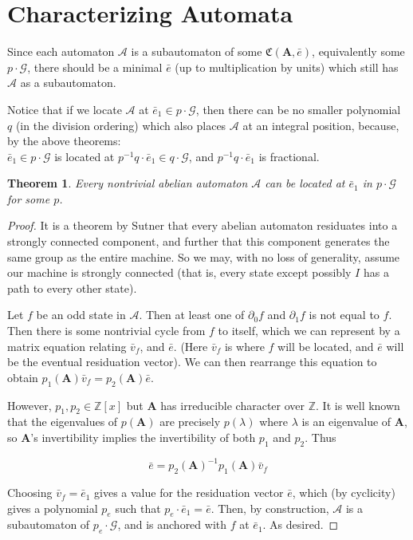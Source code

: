 \documentclass[runningheads]{llncs}
\newcommand{\A}{\mathcal{A}}
\newcommand{\G}{\mathcal{G}}
\newcommand{\C}{\mathfrak{C}(\Am,\e)}
\newcommand{\Z}{\mathbb{Z}}
\newcommand{\2}{\textbf{2}}
\newcommand{\Am}{\textbf{A}}
\newcommand{\del}{\partial}
\renewcommand{\v}{\bar{v}}
\newcommand{\e}{\bar{e}}
\newtheorem{thm}{Theorem}
\begin{document}
\section{Characterizing Automata}
Since each automaton $\A$ is a subautomaton of some $\C$,
equivalently some $p \cdot \G$, there should be a minimal $\e$ 
(up to multiplication by units) which still has $\A$ as a subautomaton. 

Notice that if we locate $\A$ at $\e_1 \in p \cdot \G$, 
then there can be no smaller polynomial $q$ (in the division ordering)
which also places $\A$ at an integral position, because, by the above
theorems:\\ 
$\e_1 \in p \cdot \G$ is located at $p^{-1}q \cdot \e_1 \in q \cdot \G$, 
and $p^{-1}q \cdot \e_1$ is fractional.


\begin{thm}
  Every nontrivial abelian automaton $\A$ can be 
  located at $\e_1$ in $p \cdot \G$ for some $p$.
\end{thm}

\begin{proof}
  It is a theorem by Sutner \cite{Sutner18:abelian_automata} that every 
  abelian automaton residuates into a strongly connected component, 
  and further that this component generates the same group as the entire 
  machine. So we may, with no loss of generality, assume our machine is 
  strongly connected (that is, every state except possibly $I$ has a path to
  every other state).

  Let $f$ be an odd state in $\A$. Then at least one of $\del_0 f$ and 
  $\del_1 f$ is not equal to $f$. Then there is some nontrivial cycle
  from $f$ to itself, which we can represent by a matrix equation 
  relating $\v_f$, and $\e$. (Here $\v_f$ is where $f$ will be located, 
  and $\e$ will be the eventual residuation vector). 
  We can then rearrange this equation to obtain 
  $p_1(\Am)\v_f = p_2(\Am)\e$.

  However, $p_1, p_2 \in \Z[x]$ but $\Am$ has irreducible character over $\Z$.
  It is well known that the eigenvalues of $p(\Am)$ are precisely $p(\lambda)$
  where $\lambda$ is an eigenvalue of $\Am$, so $\Am$'s invertibility implies
  the invertibility of both $p_1$ and $p_2$. Thus

  \[ \e = p_2(\Am)^{-1}p_1(\Am)\v_f \]

  Choosing $\v_f = \e_1$ gives a value for the residuation vector $\e$,
  which (by cyclicity) gives a polynomial $p_e$ 
  such that $p_e \cdot \e_1 = \e$. Then, by construction, $\A$ is 
  a subautomaton of $p_e \cdot \G$, and is anchored with $f$ at $\e_1$.
  As desired.
\end{proof}
\end{document}
